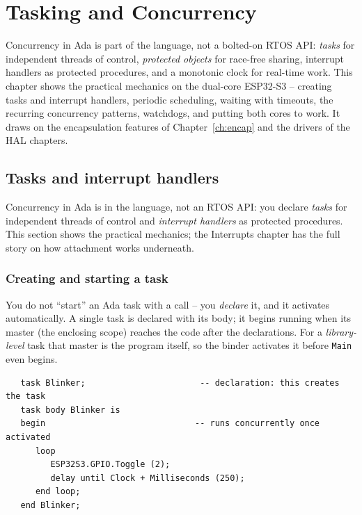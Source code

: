 \chapter{Tasking and Concurrency}
\label{ch:tasking}

Concurrency in Ada is part of the language, not a bolted-on RTOS API: \emph{tasks}
for independent threads of control, \emph{protected objects} for race-free sharing,
interrupt handlers as protected procedures, and a monotonic clock for real-time
work. This chapter shows the practical mechanics on the dual-core ESP32-S3 --
creating tasks and interrupt handlers, periodic scheduling, waiting with timeouts,
the recurring concurrency patterns, watchdogs, and putting both cores to work. It
draws on the encapsulation features of Chapter~\ref{ch:encap} and the drivers of
the HAL chapters.

\section{Tasks and interrupt handlers}
\label{sec:tasks}

Concurrency in Ada is in the language, not an RTOS API: you declare \emph{tasks}
for independent threads of control and \emph{interrupt handlers} as protected
procedures. This section shows the practical mechanics; the Interrupts chapter has
the full story on how attachment works underneath.

\subsection{Creating and starting a task}

You do not ``start'' an Ada task with a call -- you \emph{declare} it, and it
activates automatically. A single task is declared with its body; it begins
running when its master (the enclosing scope) reaches the code after the
declarations. For a \emph{library-level} task that master is the program itself,
so the binder activates it before \texttt{Main} even begins.


\begin{lstlisting}
   task Blinker;                       -- declaration: this creates the task
   task body Blinker is
   begin                              -- runs concurrently once activated
      loop
         ESP32S3.GPIO.Toggle (2);
         delay until Clock + Milliseconds (250);
      end loop;
   end Blinker;
\end{lstlisting}

